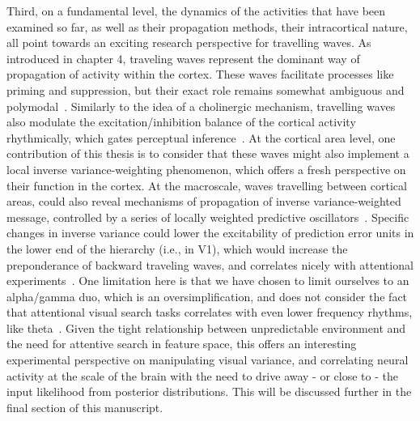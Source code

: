 Third, on a fundamental level, the dynamics of the activities that have been examined so far, as well as their propagation methods, their intracortical nature, all point towards an exciting research perspective for travelling waves. As introduced in chapter 4, traveling waves represent the dominant way of propagation of activity within the cortex. These waves facilitate processes like priming and suppression, but their exact role remains somewhat ambiguous and polymodal~\cite{muller2018cortical}. Similarly to the idea of a cholinergic mechanism, travelling waves also modulate the excitation/inhibition balance of the cortical activity rhythmically, which gates perceptual inference~\cite{dugue2011phase}. At the cortical area level, one contribution of this thesis is to consider that these waves might also implement a local inverse variance-weighting phenomenon, which offers a fresh perspective on their function in the cortex. At the macroscale, waves travelling between cortical areas, could also reveal mechanisms of propagation of inverse variance-weighted message, controlled by a series of locally weighted predictive oscillators~\cite{alamia2019alpha}. Specific changes in inverse variance could lower the excitability of prediction error units in the lower end of the hierarchy (i.e., in \gls{V1}), which would increase the preponderance of backward traveling waves, and correlates nicely with attentional experiments~\cite{alamia2019alpha}. One limitation here is that we have chosen to limit ourselves to an alpha/gamma duo, which is an oversimplification, and does not consider the fact that attentional visual search tasks correlates with even lower frequency rhythms, like theta~\cite{senoussi2019attention, michel2022distinct}. Given the tight relationship between unpredictable environment and the need for attentive search in feature space, this offers an interesting experimental perspective on manipulating visual variance, and correlating neural activity at the scale of the brain with the need to drive away - or close to - the input likelihood from posterior distributions. This will be discussed further in the final section of this manuscript.



